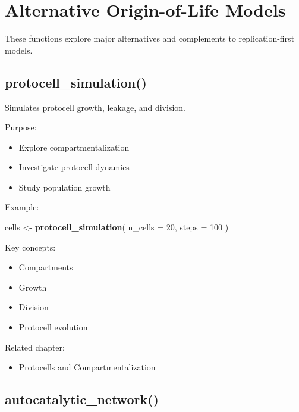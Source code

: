 \documentclass[
  oneside,
  openany]{book}
\newenvironment{Shaded}{\begin{snugshade}}{\end{snugshade}}
\newcommand{\AttributeTok}[1]{\textcolor[rgb]{0.13,0.29,0.53}{#1}}
\newcommand{\DecValTok}[1]{\textcolor[rgb]{0.00,0.00,0.81}{#1}}
\newcommand{\FunctionTok}[1]{\textcolor[rgb]{0.13,0.29,0.53}{\textbf{#1}}}
\newcommand{\NormalTok}[1]{#1}
\newcommand{\OtherTok}[1]{\textcolor[rgb]{0.56,0.35,0.01}{#1}}
\providecommand{\tightlist}{%
  \setlength{\itemsep}{0pt}\setlength{\parskip}{0pt}}
\begin{document}
\section{Alternative Origin-of-Life Models}\label{alternative-origin-of-life-models}

These functions explore major alternatives and complements to replication-first models.

\subsection{protocell\_simulation()}\label{protocell_simulation}

Simulates protocell growth, leakage, and division.

Purpose:

\begin{itemize}
\tightlist
\item
  Explore compartmentalization
\item
  Investigate protocell dynamics
\item
  Study population growth
\end{itemize}

Example:

\begin{Shaded}
\begin{Highlighting}[]
\NormalTok{cells }\OtherTok{\textless{}{-}} \FunctionTok{protocell\_simulation}\NormalTok{(}
  \AttributeTok{n\_cells =} \DecValTok{20}\NormalTok{,}
  \AttributeTok{steps =} \DecValTok{100}
\NormalTok{)}
\end{Highlighting}
\end{Shaded}

Key concepts:

\begin{itemize}
\tightlist
\item
  Compartments
\item
  Growth
\item
  Division
\item
  Protocell evolution
\end{itemize}

Related chapter:

\begin{itemize}
\tightlist
\item
  Protocells and Compartmentalization
\end{itemize}

\subsection{autocatalytic\_network()}\label{autocatalytic_network}
\end{document}
